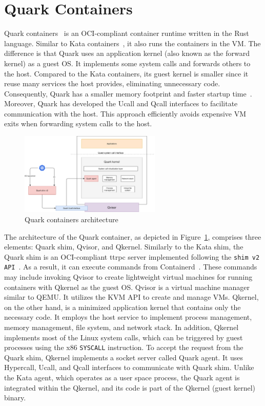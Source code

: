 \section{Quark Containers}
\label{sec:Quark}
Quark containers~\cite*{quark} is an OCI-compliant container runtime written in the Rust language. Similar to Kata containers~\cite*{Kata-Containers}, it also runs the containers in the VM. 
The difference is that Quark uses an application kernel (also known as the forward kernel) as a guest OS. It implements some system calls and forwards others to the host. Compared to the Kata containers, its guest kernel is smaller since it reuse many services the host provides, eliminating unnecessary code.
Consequently, Quark has a smaller memory footprint and faster startup time~\cite*{quark_performance_report}. Moreover, Quark has developed the Ucall and Qcall interfaces to facilitate communication with the host. This approach efficiently avoids expensive VM exits when 
forwarding system calls to the host.

\begin{figure}[htp]
  \centering
  \includegraphics[width=0.6\textwidth]{images/QUARK_ARCH.PNG}
  \caption[Quark containers architecture]{Quark containers architecture}
  \label{fig:QUARK_ARCH}
\end{figure}


The architecture of the Quark container, as depicted in Figure~\ref{fig:QUARK_ARCH}, comprises three elements: Quark shim, Qvisor, and Qkernel. Similarly to the Kata shim, the Quark shim is an OCI-compliant ttrpc server implemented following the \texttt{shim v2 API}~\cite*{shim_v2}. As a 
result, it can execute commands from Containerd~\cite*{containerd}. These commands may include invoking Qvisor to create lightweight virtual machines for running containers with Qkernel as the guest OS. Qvisor is a virtual machine manager similar to QEMU. It utilizes the KVM API to create and 
manage VMs. Qkernel, on the other hand, is a minimized application kernel that contains only the necessary code. It employs the host service to implement process management, memory management, file system, and network stack. 
In addition, Qkernel implements most of the Linux system calls, which can be triggered by guest processes using the x86 \texttt{SYSCALL} instruction. To accept the request from the Quark shim, Qkernel implements a socket server called Quark agent. It uses Hypercall, Ucall, and Qcall interfaces to 
communicate with Quark shim. Unlike the Kata agent, which operates as a user space process, the Quark agent is integrated within the Qkernel, and its code is part of the Qkernel (guest kernel) binary.



